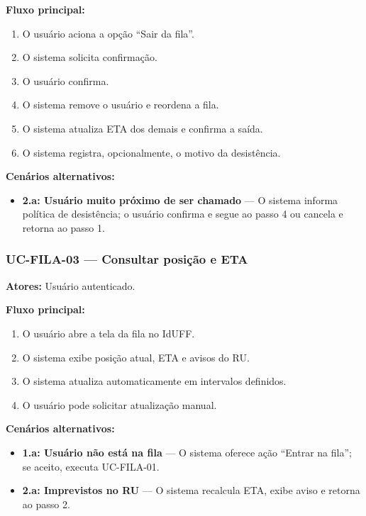 \documentclass[12pt,a4paper]{article}
\begin{document}
\textbf{Fluxo principal:}
\begin{enumerate}
    \item O usuário aciona a opção “Sair da fila”.
    \item O sistema solicita confirmação.
    \item O usuário confirma.
    \item O sistema remove o usuário e reordena a fila.
    \item O sistema atualiza ETA dos demais e confirma a saída.
    \item O sistema registra, opcionalmente, o motivo da desistência.
\end{enumerate}

\textbf{Cenários alternativos:}
\begin{itemize}
    \item \textbf{2.a: Usuário muito próximo de ser chamado} — O sistema informa política de desistência; o usuário confirma e segue ao passo 4 ou cancela e retorna ao passo 1.
\end{itemize}

\subsubsection{UC-FILA-03 — Consultar posição e ETA}
\textbf{Atores:} Usuário autenticado.  

\textbf{Fluxo principal:}
\begin{enumerate}
    \item O usuário abre a tela da fila no IdUFF.
    \item O sistema exibe posição atual, ETA e avisos do RU.
    \item O sistema atualiza automaticamente em intervalos definidos.
    \item O usuário pode solicitar atualização manual.
\end{enumerate}

\textbf{Cenários alternativos:}
\begin{itemize}
    \item \textbf{1.a: Usuário não está na fila} — O sistema oferece ação “Entrar na fila”; se aceito, executa UC-FILA-01.
    \item \textbf{2.a: Imprevistos no RU} — O sistema recalcula ETA, exibe aviso e retorna ao passo 2.
\end{itemize}

\end{document}
